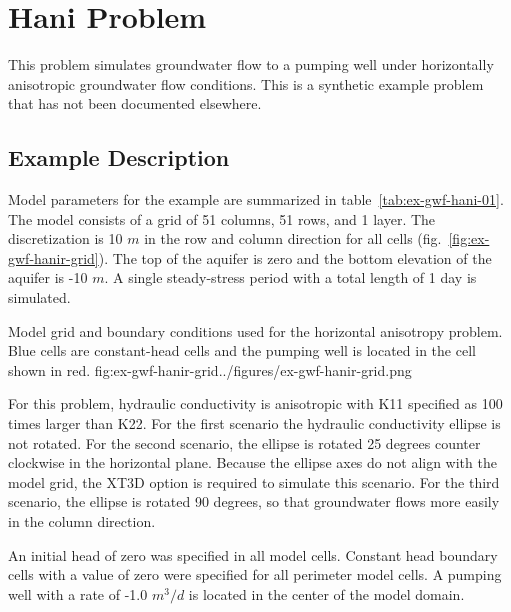\section{Hani Problem}

This problem simulates groundwater flow to a pumping well under horizontally anisotropic groundwater flow conditions.  This is a synthetic example problem that has not been documented elsewhere. 

\subsection{Example Description}

Model parameters for the example are summarized in table~\ref{tab:ex-gwf-hani-01}. The model consists of a grid of 51 columns, 51 rows, and 1 layer. The discretization is 10 $m$ in the row and column direction for all cells (fig.~\ref{fig:ex-gwf-hanir-grid}). The top of the aquifer is zero and the bottom elevation of the aquifer is -10 $m$. A single steady-stress period with a total length of 1 day is simulated.



\begin{StandardFigure}{
                                     Model grid and boundary conditions used for the horizontal anisotropy problem.  Blue cells are constant-head cells and the pumping well is located in the cell shown in red.
                                     }{fig:ex-gwf-hanir-grid}{../figures/ex-gwf-hanir-grid.png}
\end{StandardFigure}                                 

For this problem, hydraulic conductivity is anisotropic with K11 specified as 100 times larger than K22.  For the first scenario the hydraulic conductivity ellipse is not rotated.  For the second scenario, the ellipse is rotated 25 degrees counter clockwise in the horizontal plane.  Because the ellipse axes do not align with the model grid, the XT3D option \citep{modflow6xt3d} is required to simulate this scenario.  For the third scenario, the ellipse is rotated 90 degrees, so that groundwater flows more easily in the column direction.  



An initial head of zero was specified in all model cells. Constant head boundary cells with a value of zero were specified for all perimeter model cells.  A pumping well with a rate of -1.0 $m^3/d$ is located in the center of the model domain.

